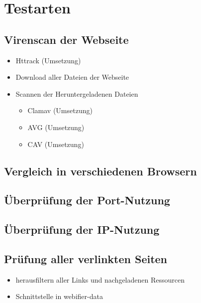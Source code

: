 \section{Testarten}
\label{par:konzept-testarten}

\subsection{Virenscan der Webseite}


\begin{itemize}
  \item Httrack (Umsetzung)
  \item Download aller Dateien der Webseite
  \item Scannen der Heruntergeladenen Dateien
  \begin{itemize}
    \item Clamav (Umsetzung)
    \item AVG (Umsetzung)
    \item CAV (Umsetzung)
  \end{itemize}
\end{itemize}

\subsection{Vergleich in verschiedenen Browsern}


\subsection{Überprüfung der Port-Nutzung}


\subsection{Überprüfung der IP-Nutzung}


\subsection{Prüfung aller verlinkten Seiten}


\begin{itemize}
  \item herausfiltern aller Links und nachgeladenen Ressourcen
  \item Schnittstelle in webifier-data
\end{itemize}

